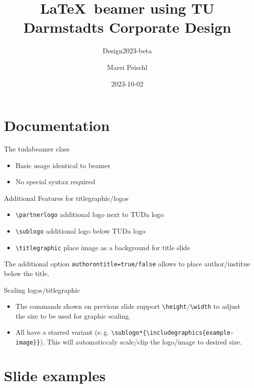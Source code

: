 \documentclass[
	english, %
	design=2023, %
	authorontitle=true,
	]{tudabeamer}
\title[TUDaBeamer2023]{\LaTeX~beamer using TU Darmstadts Corporate Design}
\subtitle{Design2023-beta}
\author[M. Peischl]{Marei Peischl}
\institute{pei\TeX}
\date{2023-10-02}
\newcommand*{\code}[1]{\texttt{#1}}
\begin{document}
\maketitle

\tableofcontents

\section{Documentation}
\sectionpage

\begin{frame}{The tudabeamer class}
\begin{itemize}
	\item Basic usage identical to beamer
	\item No special syntax required
\end{itemize}
\end{frame}

\begin{frame}{Additional Features for titlegraphic/logos}
\begin{itemize}
	\item \code{\textbackslash{}partnerlogo} additional logo next to TUDa logo
	\item \code{\textbackslash{}sublogo} additional logo below TUDa logo
	\item \code{\textbackslash{}titlegraphic} place image as a background for title slide
\end{itemize}
	The additional option \code{authorontitle=true/false} allows to place author/institue below the title.
\end{frame}

\begin{frame}{Scaling logos/titlegraphic}
\begin{itemize}
\item The commands shown on previous slide support \code{\textbackslash{}height}/\code{\textbackslash{}width} to adjust the size to be used for graphic scaling.
\item All have a starred variant (e.\,g. \code{\textbackslash{}sublogo*\{\textbackslash{}includegraphics\{example-image\}\}}). This will automaticcaly scale/clip the logo/image to desired size.
\end{itemize}
\end{frame}

\section{Slide examples}
\end{document}
